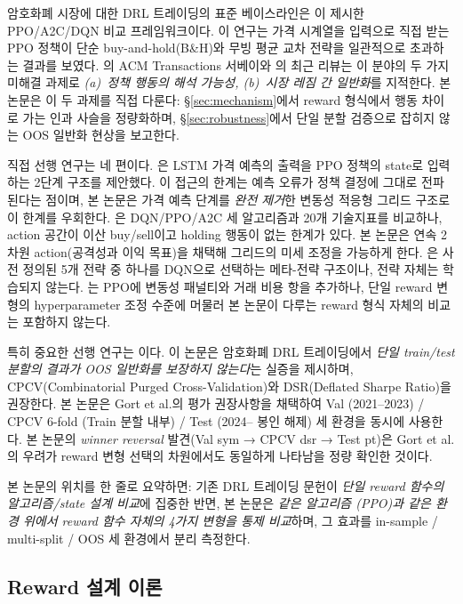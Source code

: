 \documentclass[11pt, a4paper]{article}
\begin{document}
암호화폐 시장에 대한 DRL 트레이딩의 표준 베이스라인은 \citet{zhang2020drl}이
제시한 PPO/A2C/DQN 비교 프레임워크이다. 이 연구는 가격 시계열을 입력으로
직접 받는 PPO 정책이 단순 buy-and-hold(B\&H)와 무빙 평균 교차 전략을 일관적으로
초과하는 결과를 보였다. \citet{sun2023rl}의 ACM Transactions 서베이와
\citet{liu2025review}의 최근 리뷰는 이 분야의 두 가지 미해결 과제로
\emph{(a)~정책 행동의 해석 가능성, (b)~시장 레짐 간 일반화}를 지적한다.
본 논문은 이 두 과제를 직접 다룬다: §\ref{sec:mechanism}에서 reward 형식에서
행동 차이로 가는 인과 사슬을 정량화하며, §\ref{sec:robustness}에서 단일 분할
검증으로 잡히지 않는 OOS 일반화 현상을 보고한다.

직접 선행 연구는 네 편이다. \citet{liu2021bitcoin}은 LSTM 가격 예측의 출력을
PPO 정책의 state로 입력하는 2단계 구조를 제안했다. 이 접근의 한계는 예측 오류가
정책 결정에 그대로 전파된다는 점이며, 본 논문은 가격 예측 단계를 \emph{완전 제거}한
변동성 적응형 그리드 구조로 이 한계를 우회한다. \citet{yasin2024rl}은 DQN/PPO/A2C
세 알고리즘과 20개 기술지표를 비교하나, action 공간이 이산 buy/sell이고
holding 행동이 없는 한계가 있다. 본 논문은 연속 2차원 action(공격성과 이익 목표)을
채택해 그리드의 미세 조정을 가능하게 한다. \citet{pham2025dqn}은 사전 정의된
5개 전략 중 하나를 DQN으로 선택하는 메타-전략 구조이나, 전략 자체는 학습되지
않는다. \citet{bandarupalli2025risk}는 PPO에 변동성 패널티와 거래 비용 항을
추가하나, 단일 reward 변형의 hyperparameter 조정 수준에 머물러 본 논문이
다루는 reward 형식 자체의 비교는 포함하지 않는다.

특히 중요한 선행 연구는 \citet{gort2022backtest}이다. 이 논문은 암호화폐 DRL
트레이딩에서 \emph{단일 train/test 분할의 결과가 OOS 일반화를 보장하지 않는다}는
실증을 제시하며, CPCV(Combinatorial Purged Cross-Validation)와 DSR(Deflated
Sharpe Ratio)을 권장한다. 본 논문은 Gort et al.의 평가 권장사항을 채택하여 Val
(2021--2023) / CPCV 6-fold (Train 분할 내부) / Test (2024-- 봉인 해제) 세 환경을
동시에 사용한다. 본 논문의 \emph{winner reversal} 발견(Val sym → CPCV dsr → Test
pt)은 Gort et al.의 우려가 reward 변형 선택의 차원에서도 동일하게 나타남을
정량 확인한 것이다.

본 논문의 위치를 한 줄로 요약하면: 기존 DRL 트레이딩 문헌이 \emph{단일 reward
함수의 알고리즘/state 설계 비교}에 집중한 반면, 본 논문은 \emph{같은 알고리즘
(PPO)과 같은 환경 위에서 reward 함수 자체의 4가지 변형을 통제 비교}하며,
그 효과를 in-sample / multi-split / OOS 세 환경에서 분리 측정한다.

\subsection{Reward 설계 이론}
\label{sec:related_reward}
\end{document}
